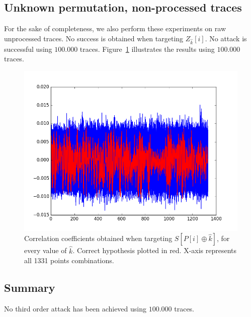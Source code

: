 \subsection{Unknown permutation, non-processed traces}
For the sake of completeness, we also perform these experiments on raw unprocessed traces. No success is obtained when targeting $Z_{\hat{k}}[i]$.
No attack is successful using $100.000$ traces.
Figure~\ref{fig:CPA3O_rawZ1} illustrates the results using $100.000$ traces.
\begin{figure}[H]
	\centering 
	\includegraphics[scale=0.35]{figures/CPA3O_rawZ1.png}
	\caption{Correlation coefficients obtained when targeting $S[P[i]\oplus \hat{k}] $, for every value of $\hat{k}$. Correct hypothesis plotted in red. X-axis represents all 1331 points combinations.}
	\label{fig:CPA3O_rawZ1}
\end{figure}

\subsection{Summary}
No third order attack has been achieved using $100.000$ traces.
